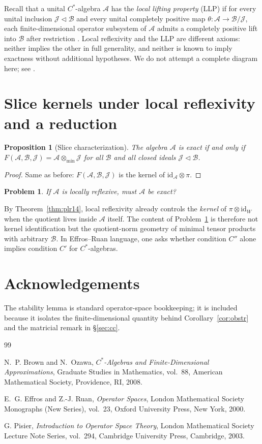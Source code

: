 \documentclass[12pt]{article}
\newtheorem{proposition}[theorem]{Proposition}
\newtheorem{problem}[theorem]{Problem}
\newcommand{\A}{\mathcal A}
\newcommand{\B}{\mathcal B}
\newcommand{\J}{\mathcal J}
\newcommand{\id}{\mathrm{id}}
\newcommand{\otmin}{\otimes_{\min}}
\begin{document}
Recall that a unital $C^*$-algebra $\A$ has the \emph{local lifting property} (LLP) if for every unital inclusion $\J\triangleleft\B$ and every unital completely positive map $\theta:\A\to \B/\J$, each finite-dimensional operator subsystem of $\A$ admits a completely positive lift into $\B$ after restriction \cite[Def.~13.1.1]{BO}.  Local reflexivity and the LLP are different axioms: neither implies the other in full generality, and neither is known to imply exactness without additional hypotheses.  We do not attempt a complete diagram here; see \cite[Ch.~9, Ch.~13]{BO}.

\section{Slice kernels under local reflexivity and a reduction}

\begin{proposition}[Slice characterization]\label{prop:slice}
The algebra $\A$ is exact if and only if $F(\A,\B,\J)=\A\otmin\J$ for all $\B$ and all closed ideals $\J\triangleleft\B$.
\end{proposition}

\begin{proof}
Same as before: $F(\A,\B,\J)$ is the kernel of $\id_\A\otimes\pi$.
\end{proof}

\begin{problem}\label{prob:main}
If $\A$ is locally reflexive, must $\A$ be exact?
\end{problem}

By Theorem~\ref{thm:plr14}, local reflexivity already controls the \emph{kernel} of $\pi\otimes\id_W$ when the quotient lives inside $\A$ itself.  The content of Problem~\ref{prob:main} is therefore not kernel identification but the quotient-norm geometry of minimal tensor products with arbitrary $\B$.  In Effros--Ruan language, one asks whether condition $C''$ alone implies condition $C'$ for $C^*$-algebras.

\section*{Acknowledgements}
The stability lemma is standard operator-space bookkeeping; it is included because it isolates the finite-dimensional quantity behind Corollary~\ref{cor:obstr} and the matricial remark in \S\ref{sec:cc}.

\begin{thebibliography}{99}

N.~P. Brown and N.~Ozawa,
\emph{$C^*$-Algebras and Finite-Dimensional Approximations},
Graduate Studies in Mathematics, vol.~88,
American Mathematical Society, Providence, RI, 2008.

E.~G. Effros and Z.-J. Ruan,
\emph{Operator Spaces},
London Mathematical Society Monographs (New Series), vol.~23,
Oxford University Press, New York, 2000.

G. Pisier,
\emph{Introduction to Operator Space Theory},
London Mathematical Society Lecture Note Series, vol.~294,
Cambridge University Press, Cambridge, 2003.

\end{thebibliography}
\end{document}
